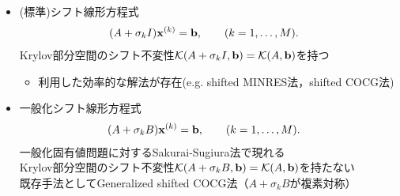 

\begin{itemize}
	\item (標準)シフト線形方程式
		\begin{align}
			(A + \sigma_{k}I)\vb{x}^{(k)} &= \vb{b}, \qquad (k=1,\dots,M).
		\end{align}
		Krylov部分空間のシフト不変性$\mathcal{K}(A+\sigma_kI, \vb{b}) = \mathcal{K}(A, \vb{b})$を持つ
		\begin{itemize}
			\item 利用した効率的な解法が存在(e.g. shifted MINRES法，shifted COCG法)
		\end{itemize}
	\item 一般化シフト線形方程式
		\begin{align}
			(A + \sigma_{k}B)\vb{x}^{(k)} &= \vb{b}, \qquad (k=1,\dots,M).
		\end{align}
		一般化固有値問題に対するSakurai-Sugiura法で現れる\\
		Krylov部分空間のシフト不変性$\mathcal{K}(A+\sigma_kB, \vb{b}) = \mathcal{K}(A, \vb{b})$を持たない\\
		既存手法としてGeneralized shifted COCG法（$A+\sigma_kB$が複素対称）\cite{ref-SogabeT-2010}
\end{itemize}
